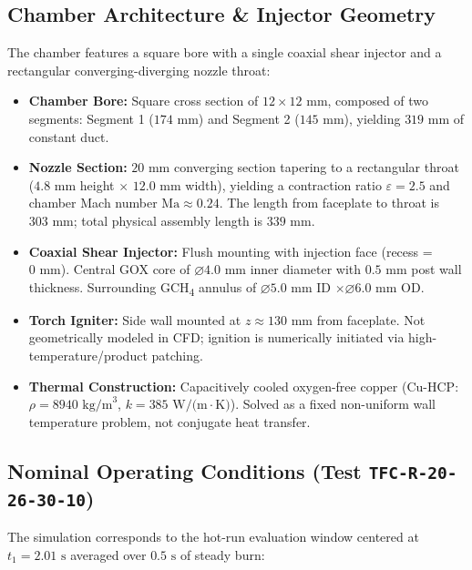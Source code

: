 \documentclass[11pt,a4paper]{article}
\begin{document}
\subsection{Chamber Architecture \& Injector Geometry}
The chamber features a square bore with a single coaxial shear injector and a rectangular converging-diverging nozzle throat:
\begin{itemize}\setlength\itemsep{0.18em}
    \item \textbf{Chamber Bore:} Square cross section of $12\times12\text{ mm}$, composed of two segments: Segment 1 ($174\text{ mm}$) and Segment 2 ($145\text{ mm}$), yielding $319\text{ mm}$ of constant duct.
    \item \textbf{Nozzle Section:} $20\text{ mm}$ converging section tapering to a rectangular throat ($4.8\text{ mm}$ height $\times$ $12.0\text{ mm}$ width), yielding a contraction ratio $\varepsilon = 2.5$ and chamber Mach number $\text{Ma} \approx 0.24$. The length from faceplate to throat is $303\text{ mm}$; total physical assembly length is $339\text{ mm}$.
    \item \textbf{Coaxial Shear Injector:} Flush mounting with injection face (recess = $0\text{ mm}$). Central GOX core of $\varnothing 4.0\text{ mm}$ inner diameter with $0.5\text{ mm}$ post wall thickness. Surrounding GCH\textsubscript{4} annulus of $\varnothing 5.0\text{ mm}$ ID $\times \varnothing 6.0\text{ mm}$ OD.
    \item \textbf{Torch Igniter:} Side wall mounted at $z \approx 130\text{ mm}$ from faceplate. Not geometrically modeled in CFD; ignition is numerically initiated via high-temperature/product patching.
    \item \textbf{Thermal Construction:} Capacitively cooled oxygen-free copper (Cu-HCP: $\rho = 8940\text{ kg/m}^3$, $k = 385\text{ W/(m}\cdot\text{K)}$). Solved as a fixed non-uniform wall temperature problem, not conjugate heat transfer.
\end{itemize}

\subsection{Nominal Operating Conditions (Test \texttt{TFC-R-20-26-30-10})}
The simulation corresponds to the hot-run evaluation window centered at $t_1 = 2.01\text{ s}$ averaged over $0.5\text{ s}$ of steady burn:
\end{document}
